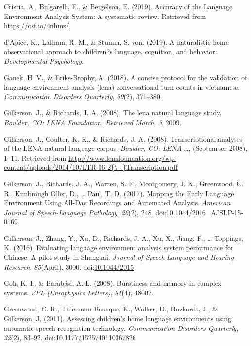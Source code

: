 \documentclass[english,floatsintext,man]{apa6}
\begin{document}
\hypertarget{ref-Cristia}{}
Cristia, A., Bulgarelli, F., \& Bergelson, E. (2019). Accuracy of the
Language Environment Analysis System: A systematic review. Retrieved
from \url{https://osf.io/4nhms/}

\hypertarget{ref-d2019naturalistic}{}
d'Apice, K., Latham, R. M., \& Stumm, S. von. (2019). A naturalistic
home observational approach to children?s language, cognition, and
behavior. \emph{Developmental Psychology}.

\hypertarget{ref-ganek2018concise}{}
Ganek, H. V., \& Eriks-Brophy, A. (2018). A concise protocol for the
validation of language environment analysis (lena) conversational turn
counts in vietnamese. \emph{Communication Disorders Quarterly},
\emph{39}(2), 371--380.

\hypertarget{ref-gilkerson2008lena}{}
Gilkerson, J., \& Richards, J. A. (2008). The lena natural language
study. \emph{Boulder, CO: LENA Foundation. Retrieved March}, \emph{3},
2009.

\hypertarget{ref-Gilkerson2008ltr6}{}
Gilkerson, J., Coulter, K. K., \& Richards, J. A. (2008).
Transcriptional analyses of the LENA natural language corpus.
\emph{Boulder, CO: LENA \ldots{}}, (September 2008), 1--11. Retrieved
from
\href{http://www.lenafoundation.org/wp-content/uploads/2014/10/LTR-06-2\%7B/_\%7DTranscription.pdf}{http://www.lenafoundation.org/wp-content/uploads/2014/10/LTR-06-2\{\textbackslash{}\_\}Transcription.pdf}

\hypertarget{ref-Gilkerson2017}{}
Gilkerson, J., Richards, J. A., Warren, S. F., Montgomery, J. K.,
Greenwood, C. R., Kimbrough Oller, D., \ldots{} Paul, T. D. (2017).
Mapping the Early Language Environment Using All-Day Recordings and
Automated Analysis. \emph{American Journal of Speech-Language
Pathology}, \emph{26}(2), 248.
doi:\href{https://doi.org/10.1044/2016_AJSLP-15-0169}{10.1044/2016\_AJSLP-15-0169}

\hypertarget{ref-Gilkerson2016}{}
Gilkerson, J., Zhang, Y., Xu, D., Richards, J. A., Xu, X., Jiang, F.,
\ldots{} Toppings, K. (2016). Evaluating language environment analysis
system performance for Chinese: A pilot study in Shanghai. \emph{Journal
of Speech Language and Hearing Research}, \emph{85}(April), 3000.
doi:\href{https://doi.org/10.1044/2015}{10.1044/2015}

\hypertarget{ref-goh2008burstiness}{}
Goh, K.-I., \& Barabási, A.-L. (2008). Burstiness and memory in complex
systems. \emph{EPL (Europhysics Letters)}, \emph{81}(4), 48002.

\hypertarget{ref-Greenwood2011}{}
Greenwood, C. R., Thiemann-Bourque, K., Walker, D., Buzhardt, J., \&
Gilkerson, J. (2011). Assessing children's home language environments
using automatic speech recognition technology. \emph{Communication
Disorders Quarterly}, \emph{32}(2), 83--92.
doi:\href{https://doi.org/10.1177/1525740110367826}{10.1177/1525740110367826}
\end{document}
